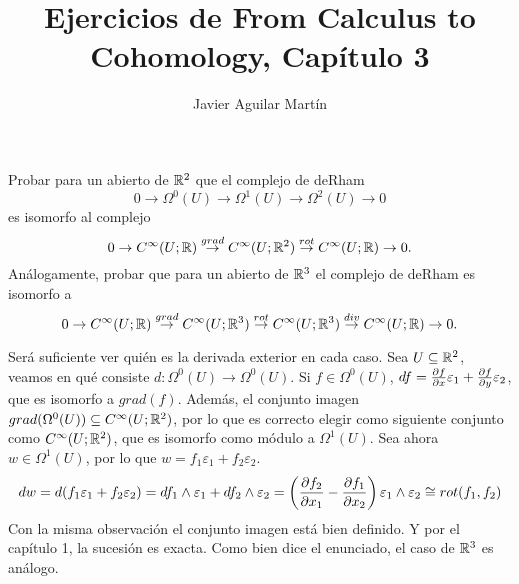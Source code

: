 \documentclass[twoside]{article}
\begin{document}
\title{Ejercicios de From Calculus to Cohomology, Capítulo 3}
\author{Javier Aguilar Martín}
\maketitle


\begin{ejercicio}{3.1}
Probar para un abierto de $\mathbb{R}^2$ que el complejo de deRham
\[
0\to\Omega^0(U)\to\Omega^1(U)\to\Omega^2(U)\to 0
\]
es isomorfo al complejo
\[
0\to C^{\infty}(U;\mathbb{R})\overset{grad}{\to}C^{\infty}(U;\mathbb{R}^2)\overset{rot}{\to}C^{\infty}(U;\mathbb{R})\to 0.
\]
Análogamente, probar que para un abierto de $\mathbb{R}^3$ el complejo de deRham es isomorfo a
\[
0\to C^{\infty}(U;\mathbb{R})\overset{grad}{\to}C^{\infty}(U;\mathbb{R}^3)\overset{rot}{\to}C^{\infty}(U;\mathbb{R}^3)\overset{div}{\to}C^{\infty}(U;\mathbb{R})\to 0.
\]
\end{ejercicio}
\begin{solucion}
Será suficiente ver quién es la derivada exterior en cada caso. Sea $U\subseteq\mathbb{R}^2$, veamos en qué consiste $d:\Omega^0(U)\to\Omega^0(U)$. Si $f\in\Omega^0(U)$, $df=\frac{\partial f}{\partial x}\varepsilon_1+\frac{\partial f}{\partial y}\varepsilon_2$, que es isomorfo a $grad(f)$. Además, el conjunto imagen $grad(\Omega^0(U))\subseteq C^{\infty}(U;\mathbb{R}^2)$, por lo que es correcto elegir como siguiente conjunto como $C^{\infty}(U;\mathbb{R}^2)$, que es isomorfo como módulo a $\Omega^1(U)$. Sea ahora $w\in\Omega^1(U)$, por lo que $w=f_1\varepsilon_1+f_2\varepsilon_2$. 
\[dw=d(f_1\varepsilon_1+f_2\varepsilon_2)=df_1\land\varepsilon_1+df_2\land\varepsilon_2=\left(\frac{\partial f_2}{\partial x_1}-\frac{\partial f_1}{\partial x_2}\right)\varepsilon_1\land\varepsilon_2\cong rot(f_1,f_2)
\]
Con la misma observación el conjunto imagen está bien definido. Y por el capítulo 1, la sucesión es exacta. Como bien dice el enunciado, el caso de $\mathbb{R}^3$ es análogo.
\end{solucion}

\newpage
\end{document}
